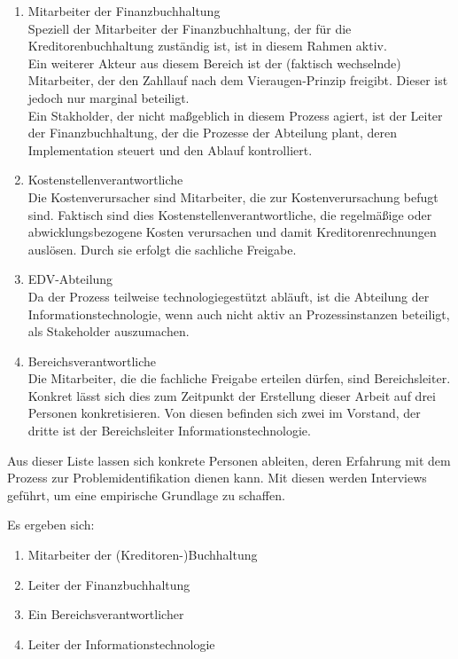 \begin{enumerate}
\item{Mitarbeiter der Finanzbuchhaltung}
\\ Speziell der Mitarbeiter der Finanzbuchhaltung, der für die Kreditorenbuchhaltung zuständig ist, ist in diesem Rahmen aktiv. 
\\ Ein weiterer Akteur aus diesem Bereich ist der (faktisch wechselnde) Mitarbeiter, der den Zahllauf nach dem Vieraugen-Prinzip freigibt. 
Dieser ist jedoch nur marginal beteiligt.
\\ Ein Stakholder, der nicht maßgeblich in diesem Prozess agiert, ist der Leiter der Finanzbuchhaltung, der die Prozesse der Abteilung plant, deren Implementation steuert und den Ablauf kontrolliert.

\item{Kostenstellenverantwortliche}
\\ Die Kostenverursacher sind Mitarbeiter, die zur Kostenverursachung befugt sind. 
Faktisch sind dies Kostenstellenverantwortliche, die regelmäßige oder abwicklungsbezogene Kosten verursachen und damit Kreditorenrechnungen auslösen. 
Durch sie erfolgt die sachliche Freigabe.

\item{EDV-Abteilung}
\\ Da der Prozess teilweise technologiegestützt abläuft, ist die Abteilung der Informationstechnologie, wenn auch nicht aktiv an Prozessinstanzen beteiligt, als Stakeholder auszumachen. 

\item{Bereichsverantwortliche}
\\ Die Mitarbeiter, die die fachliche Freigabe erteilen dürfen, sind Bereichsleiter. 
Konkret lässt sich dies zum Zeitpunkt der Erstellung dieser Arbeit auf drei Personen konkretisieren. 
Von diesen befinden sich zwei im Vorstand, der dritte ist der Bereichsleiter Informationstechnologie.\\

\end{enumerate}

Aus dieser Liste lassen sich konkrete Personen ableiten, deren Erfahrung mit dem Prozess zur Problemidentifikation dienen kann. 
Mit diesen werden Interviews geführt, um eine empirische Grundlage zu schaffen.

Es ergeben sich:

\begin{enumerate}
\item{Mitarbeiter der (Kreditoren-)Buchhaltung}
\item{Leiter der Finanzbuchhaltung}
\item{Ein Bereichsverantwortlicher}
\item{Leiter der Informationstechnologie}
\end{enumerate}



